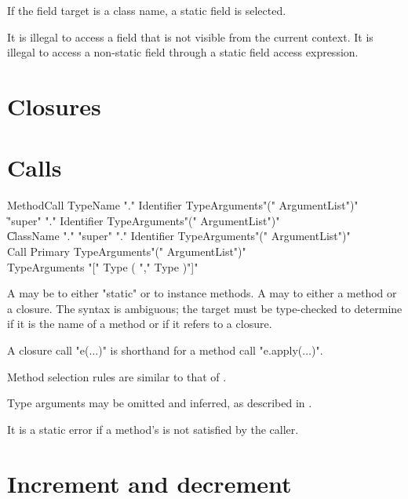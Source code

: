 If the field target is a class name, a static field is selected.

It is illegal to access  a field that is not visible from
the current context.
It is illegal to access a non-static field
through a static field access expression.

\section{Closures}
\label{Closures}


\section{Calls}
\label{MethodInvocation}
\label{MethodInvocationSubstitution}



\begin{grammar}
MethodCall \: TypeName \xcd"." Identifier TypeArguments\opt \xcd"(" ArgumentList\opt \xcd")" \\
           \| \xcd"super" \xcd"." Identifier TypeArguments\opt \xcd"(" ArgumentList\opt \xcd")" \\
           \| ClassName \xcd"." \xcd"super" \xcd"." Identifier TypeArguments\opt \xcd"(" ArgumentList\opt \xcd")" \\
Call \: Primary TypeArguments\opt \xcd"(" ArgumentList\opt \xcd")" \\
TypeArguments \: \xcd"[" Type ( \xcd"," Type )\star \xcd"]" \\
\end{grammar}

A  may be to either \xcd"static" or to instance methods.
A  may to either a method or a closure.  The syntax is ambiguous; the target must be type-checked to determine if it is the name of a method or if it refers to a closure.

A closure call \xcdmath"e($\dots$)" is shorthand for a method call \xcdmath"e.apply($\dots$)".

Method selection rules are similar to that of \java{}.

Type arguments may be omitted and inferred, as described in
.

It is a static error if a method's  is not satisfied by the caller.


\section{Increment and decrement}

